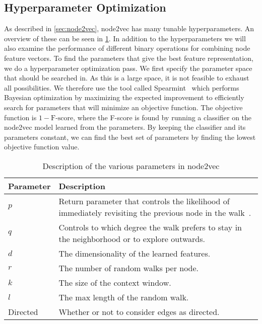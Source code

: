 \subsection{Hyperparameter Optimization}
As described in \cref{sec:node2vec}, node2vec has many tunable hyperparameters. An overview of these can be seen in \cref{tab:node2vecparams}. In addition to the hyperparameters we will also examine the performance of different binary operations for combining node feature vectors. To find the parameters that give the best feature representation, we do a hyperparameter optimization pass. We first specify the parameter space that should be searched in. As this is a large space, it is not feasible to exhaust all possibilities. We therefore use the tool called Spearmint~\cite{snoek2012practical} which performs Bayesian optimization by maximizing the expected improvement to efficiently search for parameters that will minimize an objective function. The objective function is $1 - \text{F-score}$, where the F-score is found by running a classifier on the node2vec model learned from the parameters. By keeping the classifier and its parameters constant, we can find the best set of parameters by finding the lowest objective function value.

\begin{table}[tbp]
\centering
\begin{tabular}{@{}lp{}@{}}
\toprule
\textbf{Parameter} & \textbf{Description} \\
\midrule
$p$          &   Return parameter that controls the likelihood of immediately revisiting the previous node in the walk~\cite{node2vec}.   \\
$q$          &   Controls to which degree the walk prefers to stay in the neighborhood or to explore outwards.   \\
$d$          &   The dimensionality of the learned features.   \\
$r$          &   The number of random walks per node.   \\
$k$          &   The size of the context window.   \\
$l$          &   The max length of the random walk.   \\
Directed     &   Whether or not to consider edges as directed.   \\
\bottomrule
\end{tabular}
\caption[Description of parameters in node2vec]{Description of the various parameters in node2vec}%
\label{tab:node2vecparams}
\end{table}

